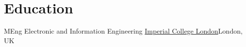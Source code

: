 

\section{Education}
  \resumeSubHeadingListStart
    \resumeSubheading
      {MEng Electronic and Information Engineering}{}
      {\href{https://www.imperial.ac.uk/study/ug/courses/electrical-engineering-department/electronic-information-meng/}{Imperial College London}}{London, UK}
      \resumeItemListStart
      \resumeItemListEnd
  \resumeSubHeadingListEnd


